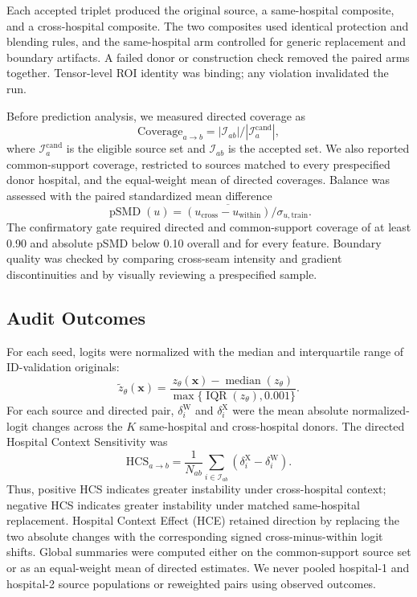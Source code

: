\documentclass[notspecified,article,submit,moreauthors]{Definitions/mdpi}
\begin{document}
Each accepted triplet produced the original source, a same-hospital composite,
and a cross-hospital composite. The two composites used identical protection
and blending rules, and the same-hospital arm controlled for generic
replacement and boundary artifacts. A failed donor or construction check
removed the paired arms together. Tensor-level ROI identity was binding; any
violation invalidated the run.

Before prediction analysis, we measured directed coverage as
\begin{equation}
\mathrm{Coverage}_{a\rightarrow b}
=|\mathcal I_{ab}|/|\mathcal I_a^{\mathrm{cand}}|,
\label{eq:pair_coverage}
\end{equation}
where $\mathcal I_a^{\mathrm{cand}}$ is the eligible source set and
$\mathcal I_{ab}$ is the accepted set. We also reported common-support
coverage, restricted to sources matched to every prespecified donor hospital,
and the equal-weight mean of directed coverages. Balance was assessed with the
paired standardized mean difference
\begin{equation}
\operatorname{pSMD}(u)=
\overline{(u_{\mathrm{cross}}-u_{\mathrm{within}})}
/\sigma_{u,\mathrm{train}}.
\end{equation}
The confirmatory gate required directed and common-support coverage of at
least 0.90 and absolute pSMD below 0.10 overall and for every feature. Boundary
quality was checked by comparing cross-seam intensity and gradient
discontinuities and by visually reviewing a prespecified sample.

\subsection{Audit Outcomes}
\label{subsec:metrics}

For each seed, logits were normalized with the median and interquartile range
of ID-validation originals:
\begin{equation}
\widetilde z_\theta(\mathbf{x})=
\frac{z_\theta(\mathbf{x})-\operatorname{median}(z_\theta)}
{\max\{\operatorname{IQR}(z_\theta),0.001\}}.
\end{equation}
For each source and directed pair, $\delta_i^{\mathrm W}$ and
$\delta_i^{\mathrm X}$ were the mean absolute normalized-logit changes across
the $K$ same-hospital and cross-hospital donors. The directed Hospital Context
Sensitivity was
\begin{equation}
\mathrm{HCS}_{a\rightarrow b}=
\frac{1}{N_{ab}}\sum_{i\in\mathcal I_{ab}}
(\delta_i^{\mathrm X}-\delta_i^{\mathrm W}).
\label{eq:pair_hcs}
\end{equation}
Thus, positive HCS indicates greater instability under cross-hospital context;
negative HCS indicates greater instability under matched same-hospital
replacement. Hospital Context Effect (HCE) retained direction by replacing
the two absolute changes with the corresponding signed cross-minus-within
logit shifts. Global summaries were computed either on the common-support
source set or as an equal-weight mean of directed estimates. We never pooled
hospital-1 and hospital-2 source populations or reweighted pairs using observed
outcomes.
\end{document}
